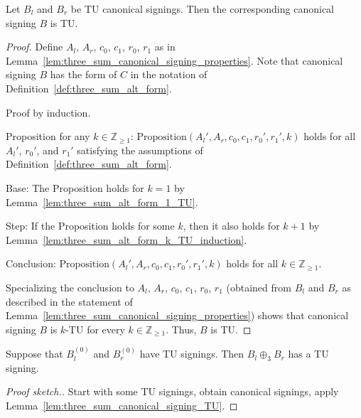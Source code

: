 \begin{lemma}\label{lem:three_sum_canonical_signing_TU}
    Let $B_{l}$ and $B_{r}$ be TU canonical signings. Then the corresponding canonical signing $B$ is TU.
\end{lemma}

\begin{proof}
    Define $A_{l}$, $A_{r}$, $c_{0}$, $c_{1}$, $r_{0}$, $r_{1}$ as in Lemma~\ref{lem:three_sum_canonical_signing_properties}. Note that canonical signing $B$ has the form of $C$ in the notation of Definition~\ref{def:three_sum_alt_form}.

    Proof by induction.

    Proposition for any $k \in \mathbb{Z}_{\geq 1}$: $\mathrm{Proposition}(A_{l}', A_{r}, c_{0}, c_{1}, r_{0}', r_{1}', k)$ holds for all $A_{l}'$, $r_{0}'$, and $r_{1}'$ satisfying the assumptions of Definition~\ref{def:three_sum_alt_form}.

    Base: The Proposition holds for $k = 1$ by Lemma~\ref{lem:three_sum_alt_form_1_TU}.

    Step: If the Proposition holds for some $k$, then it also holds for $k + 1$ by Lemma~\ref{lem:three_sum_alt_form_k_TU_induction}.

    Conclusion: $\mathrm{Proposition}(A_{l}', A_{r}, c_{0}, c_{1}, r_{0}', r_{1}', k)$ holds for all $k \in \mathbb{Z}_{\geq 1}$.

    Specializing the conclusion to $A_{l}$, $A_{r}$, $c_{0}$, $c_{1}$, $r_{0}$, $r_{1}$ (obtained from $B_{l}$ and $B_{r}$ as described in the statement of Lemma~\ref{lem:three_sum_canonical_signing_properties}) shows that canonical signing $B$ is $k$-TU for every $k \in \mathbb{Z}_{\geq 1}$. Thus, $B$ is TU.
\end{proof}

\begin{corollary}
    Suppose that $B_{l}^{(0)}$ and $B_{r}^{(0)}$ have TU signings. Then $B_{l} \oplus_{3} B_{r}$ has a TU signing.
\end{corollary}

\begin{proof}[Proof sketch.]
    Start with some TU signings, obtain canonical signings, apply Lemma~\ref{lem:three_sum_canonical_signing_TU}.
\end{proof}

